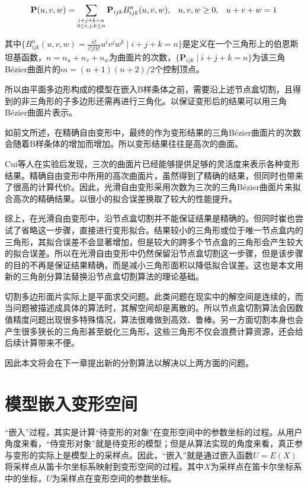 \begin{equation}
	\footnotesize
	{\mathbf P}(u,v,w)
	= \sum_{\substack{i+j+k=n \\ 0\leq i,j,k\leq n}} {\mathbf P}_{ijk}B^n_{ijk}(u,v,w), \hspace{8 pt} u,v,w\ge0,
		\hspace{8 pt}u+v+w=1
	\label{equ:Puvw}
\end{equation}

其中$\{B_{ijk}^n(u,v,w)=\frac{n!}{i!j!k!}u^iv^jw^k \mid i+j+k=n\}$是定义在一个三角形上的伯恩斯坦基函数，$n=n_u+n_v+n_w$为曲面片的次数，$\{\mathbf P_{ijk} \mid i+j+k=n\}$为该三角Bézier曲面片的$m=(n+1)(n+2)/2$个控制顶点。

所以由平面多边形构成的模型在嵌入B样条体之前，需要沿上述节点盒切割，且得到的非三角形的子多边形还需再进行三角化。以保证变形后的结果可以用三角Bézier曲面片表示。

如前文所述，在精确自由变形中，最终的作为变形结果的三角Bézier曲面片的次数会随着B样条体的增加而增加。所以变形结果往往是高次的曲面。

Cui等人在实验后\cite{Cui15}发现，三次的曲面片已经能够提供足够的灵活度来表示各种变形结果。精确自由变形中所用的高次曲面片，虽然得到了精确的结果，但同时也带来了很高的计算代价。因此，光滑自由变形采用次数为三次的三角Bézier曲面片来拟合高次的精确结果。以很小的拟合误差换取了较大的性能提升。

综上，在光滑自由变形中，沿节点盒切割并不能保证结果是精确的。但同时崔也尝试了省略这一步骤，直接进行变形拟合。结果较小的三角形或位于唯一节点盒内的三角形，其拟合误差不会显著增加，但是较大的跨多个节点盒的三角形会产生较大的拟合误差。所以在光滑自由变形中仍然保留沿节点盒切割这一步骤，但是该步骤的目的不再是保证结果精确，而是减小三角形面积以降低拟合误差。这也是本文用新的三角剖分算法替换沿节点盒切割算法的理论基础。

切割多边形面片实际上是平面求交问题。此类问题在现实中的解空间是连续的，而当问题被描述成具体的算法时，其解空间却是离散的。所以节点盒切割算法会因数值精度问题出现很多特殊情况，算法很难做到高效、鲁棒。另一方面切割本身也会产生很多狭长的三角形甚至蜕化三角形，这些三角形不仅会浪费计算资源，还会给后续计算带来不便。

因此本文将会在下一章提出新的分割算法以解决以上两方面的问题。

\section{模型嵌入变形空间}
“嵌入”过程，其实是计算“待变形的对象”在变形空间中的参数坐标的过程。从用户角度来看，“侍变形对象”就是待变形的模型；但是从算法实现的角度来看，真正参与变形的实际上是模型上的采样点。因此，“嵌入”就是通过嵌入函数$U=E(X)$将采样点从笛卡尔坐标系映射到变形空间的过程。其中$X$为采样点在笛卡尔坐标系中的坐标，$U$为采样点在变形空间的参数坐标。

